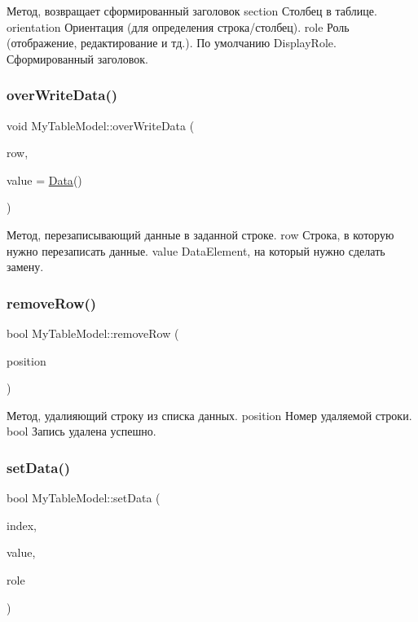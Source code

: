 Метод, возвращает сформированный заголовок section Столбец в таблице. orientation Ориентация (для определения строка/столбец). role Роль (отображение, редактирование и тд.). По умолчанию Display\+Role. Сформированный заголовок. \mbox{\label{class_my_table_model_a878078058b205a92c195d43aa45376db}} 
\subsubsection{\texorpdfstring{overWriteData()}{overWriteData()}}
{\footnotesize\ttfamily void My\+Table\+Model\+::over\+Write\+Data (\begin{DoxyParamCaption}\item[{int}]{row,  }\item[{const \mbox{\hyperlink{class_data}{Data}} \&}]{value = {\ttfamily \mbox{\hyperlink{class_data}{Data}}()} }\end{DoxyParamCaption})}

Метод, перезаписывающий данные в заданной строке. row Строка, в которую нужно перезаписать данные. value Data\+Element, на который нужно сделать замену. \mbox{\label{class_my_table_model_ae8c18be5372bf17454d21b12a368ebb3}} 
\subsubsection{\texorpdfstring{removeRow()}{removeRow()}}
{\footnotesize\ttfamily bool My\+Table\+Model\+::remove\+Row (\begin{DoxyParamCaption}\item[{const int}]{position }\end{DoxyParamCaption})}

Метод, удалияющий строку из списка данных. position Номер удаляемой строки. bool Запись удалена успешно. \mbox{\label{class_my_table_model_a9846177864f17c414cd77545e3d3a9cb}} 
\subsubsection{\texorpdfstring{setData()}{setData()}}
{\footnotesize\ttfamily bool My\+Table\+Model\+::set\+Data (\begin{DoxyParamCaption}\item[{const Q\+Model\+Index \&}]{index,  }\item[{const Q\+Variant \&}]{value,  }\item[{int}]{role }\end{DoxyParamCaption})\hspace{0.3cm}{\ttfamily [override]}}

